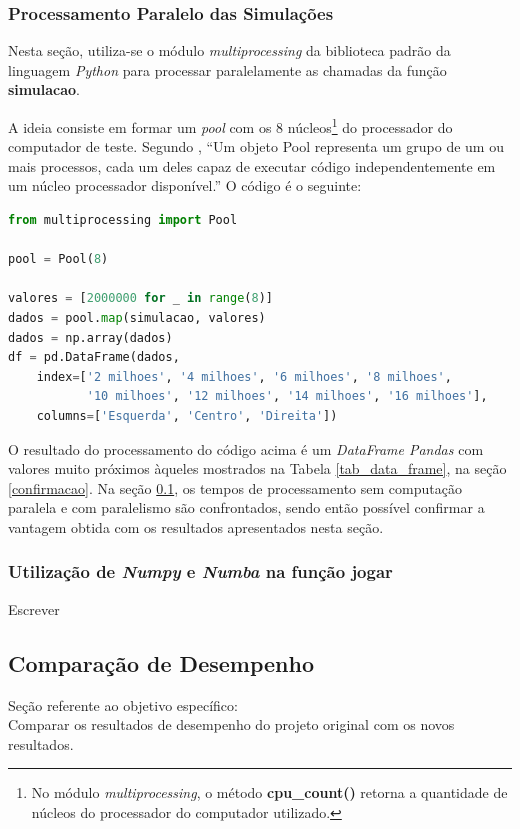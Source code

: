 \documentclass[12pt]{article}
\newcommand{\aspas}[1]{``#1''} %
\begin{document}
\subsubsection{Processamento Paralelo das Simulações}

Nesta seção, utiliza-se o módulo \textit{multiprocessing} da biblioteca padrão da linguagem \textit{Python} para processar paralelamente as chamadas da função \textbf{simulacao}.

A ideia consiste em formar um \textit{pool} com os 8 núcleos\footnote{No módulo \textit{multiprocessing}, o método \textbf{cpu\_count()} retorna a quantidade de núcleos do processador do computador utilizado.} do processador do computador de teste. Segundo \cite{perkovic:2016}, \aspas{Um objeto Pool representa um grupo de um ou mais processos, cada um deles capaz de executar código independentemente em um núcleo processador disponível.} O código é o seguinte:

\begin{lstlisting}[language=Python]
from multiprocessing import Pool

pool = Pool(8)

valores = [2000000 for _ in range(8)]
dados = pool.map(simulacao, valores)
dados = np.array(dados)
df = pd.DataFrame(dados, 
	index=['2 milhoes', '4 milhoes', '6 milhoes', '8 milhoes', 
		   '10 milhoes', '12 milhoes', '14 milhoes', '16 milhoes'], 
	columns=['Esquerda', 'Centro', 'Direita'])
\end{lstlisting}

O resultado do processamento do código acima é um \textit{DataFrame Pandas} com valores muito próximos àqueles mostrados na Tabela \ref{tab_data_frame}, na seção \ref{confirmacao}. Na seção \ref{comparacao}, os tempos de processamento sem computação paralela e com paralelismo são confrontados, sendo então possível confirmar a vantagem obtida com os resultados apresentados nesta seção.

\subsubsection{Utilização de \textit{Numpy} e \textit{Numba} na função jogar}

Escrever

\subsection{Comparação de Desempenho}
\label{comparacao}

Seção referente ao objetivo específico:\\
Comparar os resultados de desempenho do projeto original com os novos resultados.



\end{document}
